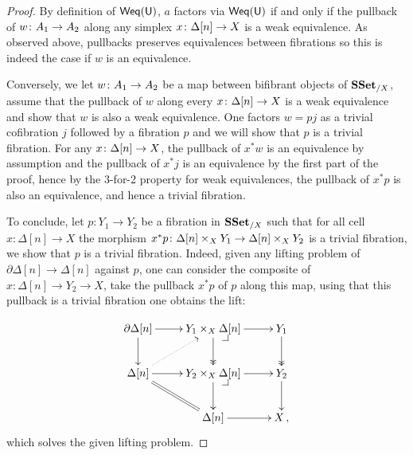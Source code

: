 \documentclass[reqno,10pt,a4paper,oneside,draft]{amsart}
\begin{document}
\begin{proof} By definition of $\mathsf{Weq}(\mathsf{U})$, $a$ factors via $\mathsf{Weq}(\mathsf{U})$ if and only if the pullback of $w \colon A_1 \to A_2$ along any simplex $x \colon \Delta[n] \rightarrow X$  is a weak equivalence. As observed above, pullbacks preserves equivalences between fibrations so this is indeed the case if $w$ is an equivalence.

Conversely,
we let $w \colon A_1 \rightarrow A_2$ be a map between bifibrant objects of $\mathbf{SSet}_{/X}$, assume that the pullback of $w$ along every $x \colon \Delta[n] \rightarrow X$ is a weak equivalence and show that $w$ is also a weak equivalence. One factors $w = p j$ as a trivial cofibration $j$ followed by a fibration $p$ and we will show that $p$ is a trivial fibration. For any $x \colon \Delta[n] \rightarrow X$, the pullback of $x^* w$ is an equivalence by assumption and the pullback of $x^* j$ is an equivalence by the first part of the proof, hence by the 3-for-2 property for weak equivalences, the pullback of $x^* p$ is also an equivalence, and hence a trivial fibration.

To conclude, let $p : Y_1 \rightarrow Y_2$ be a fibration in $\mathbf{SSet}_{/X}$ such that for all cell $x: \Delta[n] \rightarrow X$ the morphism $x^* p \colon \Delta[n]\times_X Y_1 \rightarrow \Delta[n] \times_X Y_2$ is a trivial fibration, we show that $p$ is a trivial fibration. Indeed, given any lifting problem of $\partial \Delta[n] \rightarrow \Delta[n]$ against $p$, one can consider the composite of $x: \Delta[n] \rightarrow Y_2 \rightarrow X$, take the pullback $x^* p$ of $p$ along this map, using that this pullback is a trivial fibration one obtains the lift:

\[\xymatrix{
\partial \Delta[n] \ar[d] \ar[r] & Y_1 \times_X \Delta[n] \drpullback \ar[r] \ar@{->>}[d] & Y_1 \ar@{->>}[d] \\
\Delta[n] \ar[r] \ar@{.>}[ur] \ar@{=}[dr] & Y_2 \times_X \Delta[n] \drpullback \ar[r] \ar[d] & Y_2 \ar[d] \\
& \Delta[n] \ar[r] & X \, ,
}
\]
which solves the given lifting problem.
\end{proof}
\end{document}
